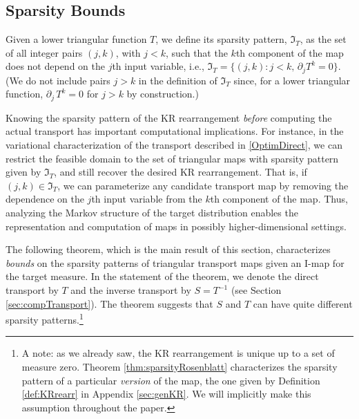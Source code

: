 \documentclass[twoside,11pt]{article}
\newcommand{\sparse}{ \mathfrak{I} }
\begin{document}
\subsection{Sparsity Bounds} \label{sec:sparsityBounds}
Given a lower triangular function $T$, we define its  
  sparsity pattern,  $\sparse_T$, as the set of all integer pairs $(j,k)$, with
$j<k$, such that the $k$th component of the map does not depend on the
$j$th input variable, i.e., 
$\sparse_T=\{ (j,k) : j<k , \,\partial_j T^k=0 \}$.
%
%
(We do not include pairs $j>k$ in the definition of $\sparse_T$  since, for a lower triangular
function, $\partial_j \, T^k = 0 $ for $j>k$ by construction.)

Knowing the sparsity pattern of the KR rearrangement
\textit{before} computing the actual transport has important
computational implications.  For instance, in the variational
characterization of the transport described in \eqref{OptimDirect}, we can
restrict the feasible domain %
%
%
to the set of triangular maps with sparsity pattern
given by $\sparse_T$, and still recover the desired KR
rearrangement.  That is, if $(j,k)\in \sparse_T$, %
we can
parameterize any candidate transport map 
%
by
removing the dependence on the $j$th input variable from the $k$th
component of the map.  
Thus, analyzing the Markov structure of the target distribution
enables the representation and computation of maps in possibly higher-dimensional
settings.

%
%
%
%
%
%
%
%
%
%
%
%
%
%
%
%
%

%
%
%
%
%
%
%
%


%
%
%
%
%
%

The following theorem, which is the main result of this section,
characterizes \textit{bounds} on the sparsity patterns of triangular
transport maps
%
given an I-map for the target measure.  In the statement of
the theorem, we denote the direct transport by $T$ and the inverse
transport by $S=T^{-1}$ (see Section \ref{sec:compTransport}).  The
theorem suggests that $S$ and $T$ can have quite different sparsity
patterns.\footnote{
A note: as we already saw, the KR rearrangement is unique up to a
set of measure zero. Theorem \ref{thm:sparsityRosenblatt} 
characterizes the sparsity pattern of a particular {\it version} of the map,
the one given by Definition \ref{def:KRrearr} in Appendix \ref{sec:genKR}.
We will implicitly make this assumption throughout the paper.
} %
\end{document}
